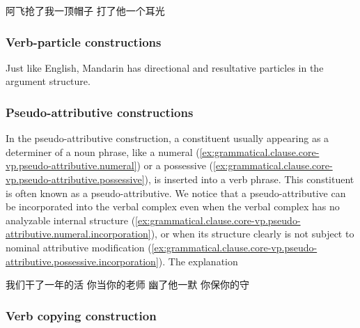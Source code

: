 \documentclass[UTF8, a4paper, oneside, scheme=plain, 12pt]{ctexrep}
\begin{document}
\begin{exe}
    \ex\label{ex:grammatical.clause.core-vp.valency.do-affect-patient.1} 阿飞抢了我一顶帽子
    \ex\label{ex:grammatical.clause.core-vp.valency.do-affect-patient.2} 打了他一个耳光
\end{exe}

\subsubsection{Verb-particle constructions}\label{sec:grammatical.clause.core-vp.particles}

Just like English, Mandarin has directional and resultative particles in the argument structure.

\subsubsection{Pseudo-attributive constructions}\label{sec:grammatical.clause.core-vp.pseudo-attributive}

In the pseudo-attributive construction,
a constituent usually appearing as a determiner of a noun phrase, 
like a numeral (\ref{ex:grammatical.clause.core-vp.pseudo-attributive.numeral})
or a possessive (\ref{ex:grammatical.clause.core-vp.pseudo-attributive.possessive}),
is inserted into a verb phrase.
This constituent is often known as a pseudo-attributive.
We notice that a pseudo-attributive can be incorporated into the verbal complex
even when the verbal complex has no analyzable internal structure
(\ref{ex:grammatical.clause.core-vp.pseudo-attributive.numeral.incorporation}),
or when its structure clearly is not subject to nominal attributive modification
(\ref{ex:grammatical.clause.core-vp.pseudo-attributive.possessive.incorporation}).
The explanation 

\begin{exe}
    \ex\label{ex:grammatical.clause.core-vp.pseudo-attributive.numeral} 我们干了一年的活
    \ex\label{ex:grammatical.clause.core-vp.pseudo-attributive.possessive} 你当你的老师
    \ex\label{ex:grammatical.clause.core-vp.pseudo-attributive.numeral.incorporation} 幽了他一默
    \ex\label{ex:grammatical.clause.core-vp.pseudo-attributive.possessive.incorporation} 你保你的守
\end{exe}

\subsubsection{Verb copying construction}
\end{document}

